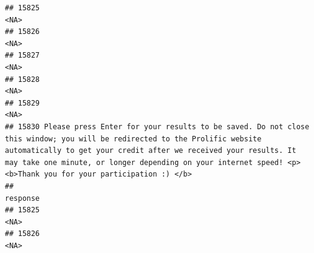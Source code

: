 \documentclass[
]{article}
\begin{document}
\begin{verbatim}
## 15825                                                                                                                                                                                                                                                                                                          <NA>
## 15826                                                                                                                                                                                                                                                                                                          <NA>
## 15827                                                                                                                                                                                                                                                                                                          <NA>
## 15828                                                                                                                                                                                                                                                                                                          <NA>
## 15829                                                                                                                                                                                                                                                                                                          <NA>
## 15830 Please press Enter for your results to be saved. Do not close this window; you will be redirected to the Prolific website automatically to get your credit after we received your results. It may take one minute, or longer depending on your internet speed! <p><b>Thank you for your participation :) </b>
##                                                                                                                                                                                                                                                                                                           response
## 15825                                                                                                                                                                                                                                                                                                         <NA>
## 15826                                                                                                                                                                                                                                                                                                         <NA>

\end{verbatim}
\end{document}
